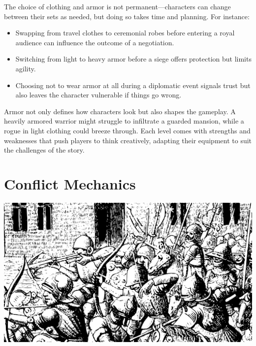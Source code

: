 \documentclass[12pt]{book}  %
\begin{document}
The choice of clothing and armor is not permanent—characters can change between their sets as needed, but doing so takes time and planning. For instance:

\begin{itemize}
    \item Swapping from travel clothes to ceremonial robes before entering a royal audience can influence the outcome of a negotiation.
    \item Switching from light to heavy armor before a siege offers protection but limits agility.
    \item Choosing not to wear armor at all during a diplomatic event signals trust but also leaves the character vulnerable if things go wrong.
\end{itemize}

Armor not only defines how characters look but also shapes the gameplay. A heavily armored warrior might struggle to infiltrate a guarded mansion, while a rogue in light clothing could breeze through. Each level comes with strengths and weaknesses that push players to think creatively, adapting their equipment to suit the challenges of the story.

\chapter{Conflict Mechanics}

\begin{center}
    \includegraphics[width=\textwidth]{./images/combat01.pdf}
\end{center}
\end{document}
